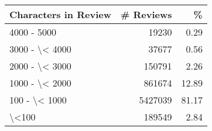 \begin{tabular}{lrr}
\toprule
Characters in Review &  \# Reviews &      \% \\
\midrule
         4000 - 5000 &      19230 &   0.29 \\
      3000 - \textbackslash < 4000 &      37677 &   0.56 \\
      2000 - \textbackslash < 3000 &     150791 &   2.26 \\
      1000 - \textbackslash < 2000 &     861674 &  12.89 \\
       100 - \textbackslash < 1000 &    5427039 &  81.17 \\
               \textbackslash <100 &     189549 &   2.84 \\
\bottomrule
\end{tabular}
